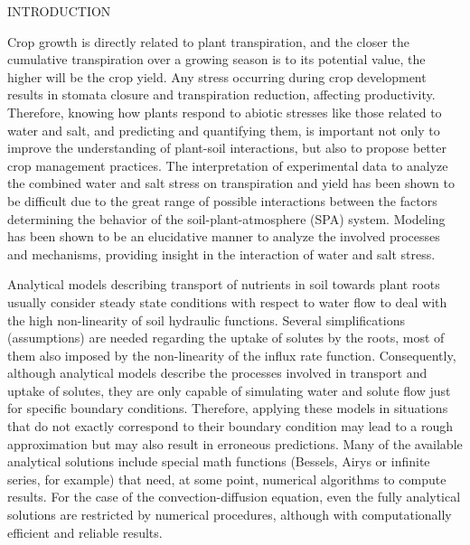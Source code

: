 \cleardoublepage

\def\quic{Quirijn's COMMENT: }

\chap INTRODUCTION

Crop growth is directly related to plant transpiration, and the closer the cumulative transpiration over a growing season is to its potential value, the higher will be the crop yield. 
Any stress occurring during crop development results in stomata closure and transpiration reduction, affecting productivity. 
Therefore, knowing how plants respond to abiotic stresses like those related to water and salt, and predicting and quantifying them, is important not only to improve the understanding of plant-soil interactions, but also to propose better crop management practices.
The interpretation of experimental data to analyze the combined water and salt stress on transpiration and yield has been shown to be difficult due to the great range of possible interactions between the factors determining the behavior of the soil-plant-atmosphere (SPA) system.
Modeling has been shown to be an elucidative manner to analyze the involved processes and mechanisms, providing insight in the interaction of water and salt stress.

Analytical models describing transport of nutrients in soil towards plant roots usually consider steady state conditions with respect to water flow to deal with the high non-linearity of soil hydraulic functions. 
Several simplifications (assumptions) are needed regarding the uptake of solutes by the roots, most of them also imposed by the non-linearity of the influx rate function. 
Consequently, although analytical models describe the processes involved in transport and uptake of solutes, they are only capable of simulating water and solute flow just for specific boundary conditions.
Therefore, applying these models in situations that do not exactly correspond to their boundary condition may lead to a rough approximation but may also result in erroneous predictions.
Many of the available analytical solutions include special math functions (Bessels, Airys or infinite series, for example) that need, at some point, numerical algorithms to compute results.
For the case of the convection-diffusion equation, even the fully analytical solutions are restricted by numerical procedures, although with computationally efficient and reliable results.

